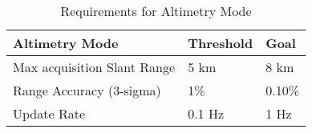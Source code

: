 \begin{table}[H]
\centering
\caption{Requirements for Altimetry Mode}
\label{tab:req_altimetry}
\begin{tabular}{|l|ll|} \hline
\textbf{Altimetry Mode}     & Threshold & Goal   \\ \hline
Max acquisition Slant Range & 5 km      & 8 km   \\
Range Accuracy (3-sigma)    & 1\%       & 0.10\% \\
Update Rate                 & 0.1 Hz    & 1 Hz   \\ \hline
\end{tabular}
\end{table}